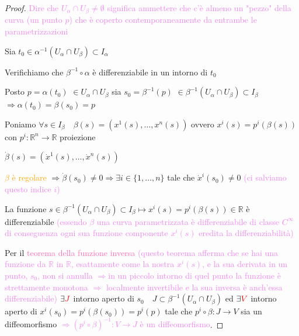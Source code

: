         \begin{proof}
        \mbox{}
        \textcolor{violet}{Dire che $U_\alpha \cap U_\beta \neq \emptyset$ significa ammettere che c'è almeno un "pezzo" della curva (un punto $p$) che è coperto 
        contemporaneamente da entrambe le parametrizzazioni}

        Sia $t_0 \in \alpha^{-1} \left(U_{\alpha} \cap U_{\beta} \right) \subset I_\alpha$
        
        Verifichiamo che $\beta^{-1} \circ \alpha$ è differenziabile in un intorno di $t_0$

        Posto \textcolor{amber}{$p = \alpha(t_0)$} $\in U_{\alpha} \cap U_{\beta}$ sia \textcolor{amber}{$s_0= \beta^{-1}(p)$} $\in \beta^{-1} \left(U_{\alpha} \cap U_{\beta} \right) \subset I_\beta$
        $\Rightarrow \alpha(t_0)= \beta(s_0)=p$

        Poniamo $\forall s \in I_\beta \quad \beta(s)=\left(x^1(s), \ldots, x^n(s)\right)$ ovvero $x^i(s)=p^i(\beta(s))$ 
        con $p^i: \mathbb{R}^n \to \mathbb{R}$ proiezione

        $\dot{\beta}(s) = \left(\dot{x}^1(s), \ldots, \dot{x}^n(s)\right)$
        
        \textcolor{orange}{$\beta$ è regolare} $\Rightarrow \dot{\beta}(s_0) \neq 0 \Rightarrow \exists i \in \{1, \ldots, n\}$ tale che $\dot{x}^i(s_0) \neq 0$ \textcolor{violet}{(ci salviamo
        questo indice $i$)}

        La funzione $s \in \beta^{-1} \left(U_{\alpha} \cap U_{\beta} \right) \subset I_\beta \mapsto x^i(s)= p^i(\beta(s)) \in \mathbb{R}$ 
        è differenziabile \textcolor{violet}{(essendo $\beta$ una curva parametrizzata è differenziabile di classe $C^\infty$ di conseguenza ogni sua funzione componente 
        $x^i(s)$ eredita la differenziabilità)}

        Per il \textcolor{hotpink}{teorema della funzione inversa} \textcolor{violet}{(questo teorema afferma che se hai una funzione da
         $\mathbb{R}$ in $\mathbb{R}$, esattamente come la nostra $x^i(s)$, e la sua derivata in un punto, $s_0$, non si annulla $\Rightarrow$in un piccolo intorno di quel punto la funzione 
         è strettamente monotona $\Rightarrow$ localmente invertibile e la sua inversa è anch'essa differenziabile)} $\exists \textcolor{red}{J} $ intorno aperto di $s_0 \quad J \subset \beta^{-1} \left(U_{\alpha} \cap U_{\beta} \right)$ ed
        $\exists \textcolor{red}{V}$ intorno aperto di $x^i(s_0) = p^i(\beta(s_0)) = p^i(p)$ tale che \textcolor{celeste}{$p^i \circ \beta: J \to V$ sia un diffeomorfismo} 
        \textcolor{violet}{$\Rightarrow (p^i \circ \beta)^{-1} : V \to J$ è un diffeomorfismo}.


\end{proof}
